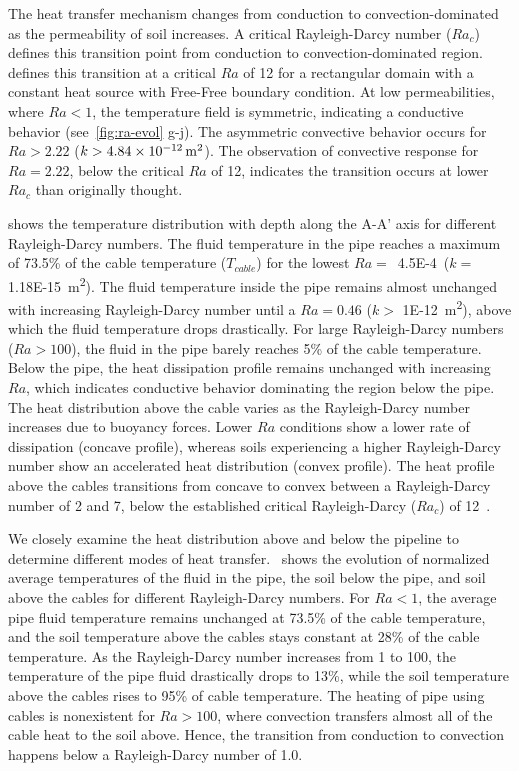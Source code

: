 \documentclass[Journal,letterpaper,InsideFigs]{ascelike-new}
\begin{document}
The heat transfer mechanism changes from conduction to convection-dominated as the permeability of soil increases. A critical Rayleigh-Darcy number ($Ra_c$) defines this transition point from conduction to convection-dominated region.~ defines this transition at a critical $Ra$ of 12 for a rectangular domain with a constant heat source with Free-Free boundary condition. At low permeabilities, where $Ra < 1$, the temperature field is symmetric, indicating a conductive behavior (see~\cref{fig:ra-evol} g-j). The asymmetric convective behavior occurs for $Ra > 2.22$ ($k > \SI{4.84E-12}{\meter\squared}$). The observation of convective response for $Ra = 2.22$, below the critical $Ra$ of 12, indicates the transition occurs at lower $Ra_c$ than originally thought. 

 shows the temperature distribution with depth along the A-A' axis for different Rayleigh-Darcy numbers. The fluid temperature in the pipe reaches a maximum of 73.5\% of the cable temperature ($T_{cable}$) for the lowest $Ra = $~\SI{4.5E-4} ($k =$ \SI{1.18E-15}{\meter\squared}). The fluid temperature inside the pipe remains almost unchanged with increasing Rayleigh-Darcy number until a $Ra = 0.46$ ($k >$ \SI{1E-12}{\meter\squared}), above which the fluid temperature drops drastically. For large Rayleigh-Darcy numbers ($Ra > 100$), the fluid in the pipe barely reaches 5\% of the cable temperature. Below the pipe, the heat dissipation profile remains unchanged with increasing $Ra$, which indicates conductive behavior dominating the region below the pipe. The heat distribution above the cable varies as the Rayleigh-Darcy number increases due to buoyancy forces. Lower $Ra$ conditions show a lower rate of dissipation (concave profile), whereas soils experiencing a higher Rayleigh-Darcy number show an accelerated heat distribution (convex profile). The heat profile above the cables transitions from concave to convex between a Rayleigh-Darcy number of 2 and 7, below the established critical Rayleigh-Darcy ($Ra_c$) of 12~\cite{nield1968onset}. 

We closely examine the heat distribution above and below the pipeline to determine different modes of heat transfer.~ shows the evolution of normalized average temperatures of the fluid in the pipe, the soil below the pipe, and soil above the cables for different Rayleigh-Darcy numbers. For $Ra < 1$, the average pipe fluid temperature remains unchanged at 73.5\% of the cable temperature, and the soil temperature above the cables stays constant at 28\% of the cable temperature. As the Rayleigh-Darcy number increases from 1 to 100, the temperature of the pipe fluid drastically drops to 13\%, while the soil temperature above the cables rises to 95\% of cable temperature. The heating of pipe using cables is nonexistent for $Ra > 100$, where convection transfers almost all of the cable heat to the soil above. Hence, the transition from conduction to convection happens below a Rayleigh-Darcy number of 1.0.
\end{document}
